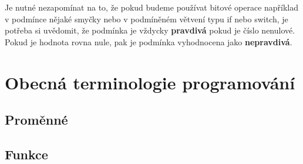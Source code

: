 \documentclass[twoside,a4paper]{article} %
\begin{document}
Je nutné nezapomínat na to, že pokud budeme používat bitové operace například v podmínce nějaké smyčky nebo v podmíněném větvení typu if nebo switch, je potřeba si uvědomit, že podmínka je vždycky \textbf{pravdivá} pokud je číslo nenulové. Pokud je hodnota rovna nule, pak je podmínka vyhodnocena jako \textbf{nepravdivá}.

\section{Obecná terminologie programování}
\subsection{Proměnné}
\subsection{Funkce}


\newpage

\newpage
{}
\printbibliography
\nocite{*}
\end{document}
